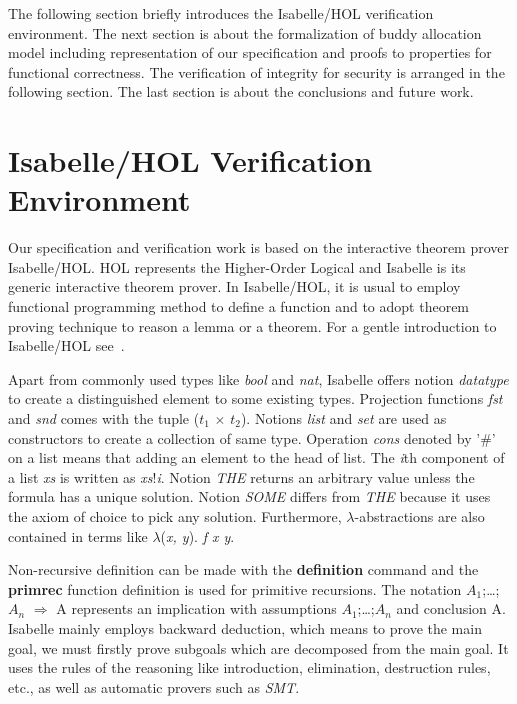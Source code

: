 \documentclass[runningheads]{llncs}
\begin{document}
The following section briefly introduces the Isabelle/HOL verification environment. The next section is about the formalization of buddy allocation model including representation of our specification and proofs to properties for functional correctness. The verification of integrity for security is arranged in the following section. The last section is about the conclusions and future work.


\section{Isabelle/HOL Verification Environment}
Our specification and verification work is based on the interactive theorem prover Isabelle/HOL. HOL represents the Higher-Order Logical and Isabelle is its generic interactive theorem prover. In Isabelle/HOL, it is usual to employ functional programming method to define a function and to adopt theorem proving technique to reason a lemma or a theorem. For a gentle introduction to Isabelle/HOL see~\cite{reg_Isabelle/HOL}.

Apart from commonly used types like \emph{bool} and \emph{nat}, Isabelle offers notion \emph{datatype} to create a distinguished element to some existing types. Projection functions \emph{fst} and \emph{snd} comes with the tuple (\emph{$t_1$} $\times$ \emph{$t_2$}). Notions \emph{list} and \emph{set} are used as constructors to create a collection of same type. Operation \emph{cons} denoted by '$\#$' on a list means that adding an element to the head of list. The \emph{i}th component of a list \emph{xs} is written as \emph{xs}!\emph{i}. Notion \emph{THE} returns an arbitrary value unless the formula has a unique solution. Notion \emph{SOME} differs from \emph{THE} because it uses the
axiom of choice to pick any solution. Furthermore, $\lambda$-abstractions are also contained in terms like $\lambda$(\emph{x, y}). \emph{f x y}.

Non-recursive definition can be made with the \textbf{definition} command and the \textbf{primrec} function definition is used for primitive recursions. The notation {\isasymlbrakk} $A_1$;\dots;$A_n${\isasymrbrakk} $\Longrightarrow$ A represents an implication with assumptions $A_1$;\dots;$A_n$ and conclusion A. Isabelle mainly employs backward deduction, which means to prove the main goal, we must firstly prove subgoals which are decomposed from the main goal. It uses the rules of the reasoning like introduction, elimination, destruction rules, etc., as well as automatic provers such as \emph{SMT}.
\end{document}
